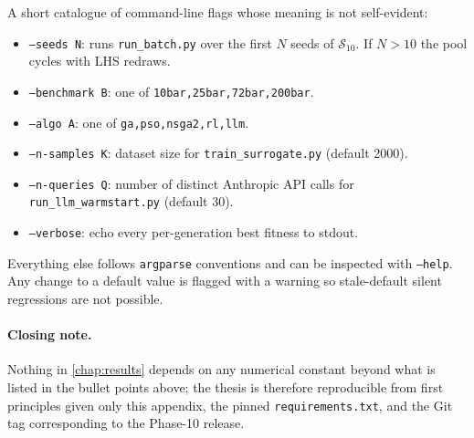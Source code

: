 A short catalogue of command-line flags whose meaning is not
self-evident:
\begin{itemize}
  \item \texttt{--seeds N}: runs \texttt{run\_batch.py} over the
    first $N$ seeds of $\mathcal{S}_{10}$. If $N>10$ the pool
    cycles with LHS redraws.
  \item \texttt{--benchmark B}: one of
    \texttt{10bar,25bar,72bar,200bar}.
  \item \texttt{--algo A}: one of
    \texttt{ga,pso,nsga2,rl,llm}.
  \item \texttt{--n-samples K}: dataset size for
    \texttt{train\_surrogate.py} (default \num{2000}).
  \item \texttt{--n-queries Q}: number of distinct Anthropic API
    calls for \texttt{run\_llm\_warmstart.py} (default \num{30}).
  \item \texttt{--verbose}: echo every per-generation best
    fitness to stdout.
\end{itemize}
Everything else follows \texttt{argparse} conventions and can be
inspected with \texttt{--help}. Any change to a default value is
flagged with a warning so stale-default silent regressions are
not possible.

\paragraph{Closing note.} Nothing in \cref{chap:results} depends
on any numerical constant beyond what is listed in the bullet
points above; the thesis is therefore reproducible from first
principles given only this appendix, the pinned
\texttt{requirements.txt}, and the Git tag corresponding to the
Phase-10 release.
